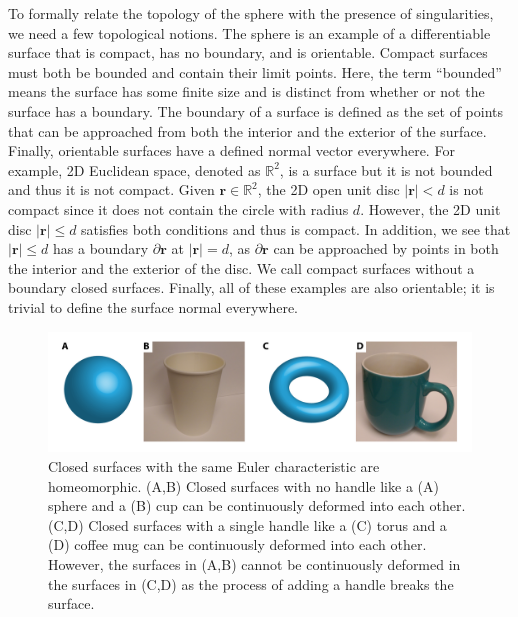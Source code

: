 To formally relate the topology of the sphere with the presence of singularities, we need a few topological notions.
The sphere is an example of a differentiable surface that is compact, has no boundary, and is orientable.
Compact surfaces must both be bounded and contain their limit points.
Here, the term ``bounded'' means the surface has some finite size and is distinct from whether or not the surface has a boundary.
The boundary of a surface is defined as the set of points that can be approached from both the interior and the exterior of the surface.
Finally, orientable surfaces have a defined normal vector everywhere.
For example, 2D Euclidean space, denoted as $\mathbb{R}^2$, is a surface but it is not bounded and thus it is not compact.
Given $\mathbf{r} \in \mathbb{R}^2$, the 2D open unit disc $|\mathbf{r}| < d$ is not compact since it does not contain the circle with radius $d$.
However, the 2D unit disc $|\mathbf{r}| \leq d$ satisfies both conditions and thus is compact.
In addition, we see that $|\mathbf{r}| \leq d$ has a boundary $\partial \mathbf{r}$ at $|\mathbf{r}| = d$, as $\partial \mathbf{r}$ can be approached by points in both the interior and the exterior of the disc.
We call compact surfaces without a boundary closed surfaces.
Finally, all of these examples are also orientable; it is trivial to define the surface normal everywhere.
\begin{figure}
  \centering
  \includegraphics{figures/C1/Ch1-Figs_ChiObjects.png}
  \caption{Closed surfaces with the same Euler characteristic are homeomorphic. (A,B) Closed surfaces with no handle like a (A) sphere and a (B) cup can be continuously deformed into each other.
  (C,D) Closed surfaces with a single handle like a (C) torus and a (D) coffee mug can be continuously deformed into each other.
  However, the surfaces in (A,B) cannot be continuously deformed in the surfaces in (C,D) as the process of adding a handle breaks the surface.}\label{f:1-ChiObjects}
\end{figure}

